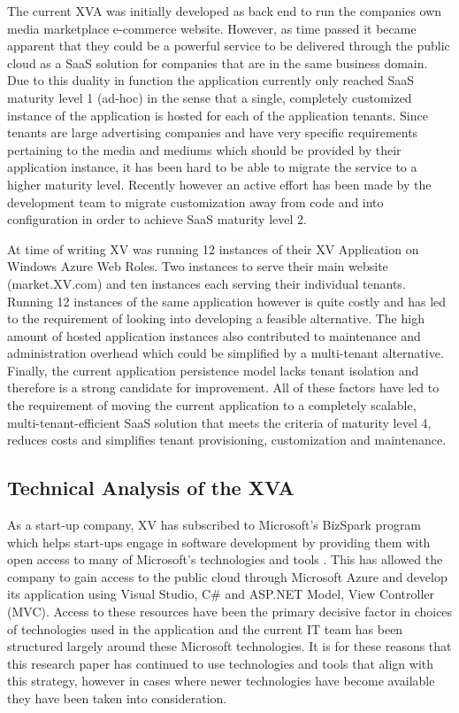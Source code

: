 The current XVA was initially developed as back end to run the companies own media marketplace e-commerce website. However, as time passed it became apparent that they could be a powerful service to be delivered through the public cloud as a SaaS solution for companies that are in the same business domain. Due to this duality in function the application currently only reached SaaS maturity level 1 (ad-hoc) \cite{Chong2006} in the sense that a single, completely customized instance of the application is hosted for each of the application tenants. Since tenants are large advertising companies and have very specific requirements pertaining to the media and mediums which should be provided by their application instance, it has been hard to be able to migrate the service to a higher maturity level. Recently however an active effort has been made by the development team to migrate customization away from code and into configuration in order to achieve SaaS maturity level 2.
 
 
 
At time of writing XV was running 12 instances of their XV Application on Windows Azure Web Roles. Two instances to serve their main website (market.XV.com) and ten instances each serving their individual tenants. Running 12 instances of the same application however is quite costly and has led to the requirement of looking into developing a feasible alternative. The high amount of hosted application instances also contributed to maintenance and administration overhead which could be simplified by a multi-tenant alternative. Finally, the current application persistence model lacks tenant isolation and therefore is a strong candidate for improvement. All of these factors have led to the requirement of moving the current application to a completely scalable, multi-tenant-efficient SaaS solution that meets the criteria of maturity level 4, reduces costs and simplifies tenant provisioning, customization and maintenance.




\subsection{Technical Analysis of the XVA}

As a start-up company, XV has subscribed to Microsoft's BizSpark program which helps start-ups engage in software development by providing them with open access to many of Microsoft's technologies and tools \cite{BizSpark}. This has allowed the company to gain access to the public cloud through Microsoft Azure and develop its application using Visual Studio, C\# and ASP.NET Model, View Controller (MVC). Access to these resources have been the primary decisive factor in choices of technologies used in the application and the current IT team has been structured largely around these Microsoft technologies. It is for these reasons that this research paper has continued to use technologies and tools that align with this strategy, however in cases where newer technologies have become available they have been taken into consideration.
 
